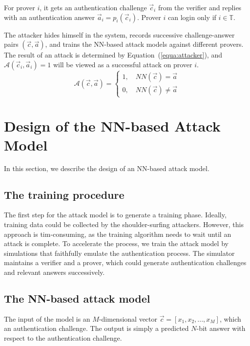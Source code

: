 \documentclass{article}
\begin{document}
For prover $i$, it gets an authentication challenge $\vec{c}_i$ from the verifier and replies with an authentication answer $\vec{a}_i = p_i(\vec{c}_i)$. Prover $i$ can login only if $i \in \mathbb{T}$.

The attacker hides himself in the system, records successive challenge-answer pairs $(\vec{c}, \vec{a})$, and trains the NN-based attack models against different provers. The result of an attack is determined by Equation~(\ref{equa:attacker}), and $\mathcal{A}(\vec{c}_i,\vec{a}_i)=1$ will be viewed as a successful attack on prover $i$.
\begin{equation}
    \mathcal{A}(\vec{c}, \vec{a})=
  \left\{
   \begin{aligned}
   1, \quad NN(\vec{c}) = \vec{a} \\
   0, \quad NN(\vec{c}) \neq \vec{a}
   \end{aligned}
   \right.
  \label{equa:attacker}
\end{equation}


\section{Design of the NN-based Attack Model}\label{sec:design}
In this section, we describe the design of an NN-based attack model.


\subsection{The training procedure}
The first step for the attack model is to generate a training phase. Ideally, training data could be collected by the shoulder-surfing attackers. However, this approach is tim-consuming, as the training algorithm needs to wait until an attack is complete. To accelerate the process, we train the attack model by simulations that faithfully emulate the authentication process. The simulator maintains a verifier and a prover, which could generate authentication challenges and relevant answers successively.

\subsection{The NN-based attack model}
The input of the model is an $M$-dimensional vector  $\vec c = [x_1, x_2,...,x_M]$, which an authentication challenge. The output is simply a predicted $N$-bit answer with respect to the authentication challenge.
\end{document}

